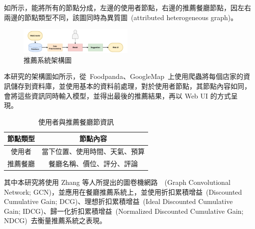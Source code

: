 如所示，能將所有的節點分成，左邊的使用者節點，右邊的推薦餐廳節點，因左右兩邊的節點類型不同，該圖同時為異質圖~(attributed heterogeneous graph)。
\begin{figure}[tbh]
    \centering
    \includegraphics[width=0.5\textwidth]{img/flowg2.pdf}
    \caption{推薦系統架構圖}
    \label{fig-flowchart}
\end{figure}
本研究的架構圖如所示，從~Foodpanda、GoogleMap~上使用爬蟲將每個店家的資訊儲存到資料庫，並使用基本的資料前處理，對於使用者節點，其節點內容如同，會將這些資訊同時輸入模型，並得出最後的推薦結果，再以 Web UI 的方式呈現。
\begin{table}[htbp]
    \centering
    \renewcommand{\arraystretch}{1.15}
    \setlength{\tabcolsep}{7.5pt}
    \begin{tabular}{|c|c|}
    \hline
    \textbf{節點類型}   & \textbf{節點內容}                    \\ \hline
    使用者         & 當下位置、使用時間、天氣、預算          \\ \hline
    推薦餐廳      & 餐廳名稱、價位、評分、評論              \\ \hline
    \end{tabular}
    \caption{使用者與推薦餐廳節資訊}
    \label{node-conetent}
\end{table}
其中本研究將使用 Zhang 等人所提出的圖卷機網路~\cite{GCN}~(Graph Convolutional Network; GCN)，並應用在餐廳推薦系統上，並使用折扣累積增益~(Discounted Cumulative Gain; DCG)、理想折扣累積增益~(Ideal Discounted Cumulative Gain; IDCG)、歸一化折扣累積增益~(Normalized Discounted Cumulative Gain; NDCG)~去衡量推薦系統之表現。




    